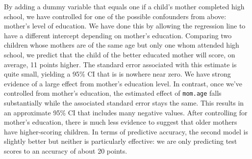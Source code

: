 \documentclass[addpoints,12pt]{exam}\usepackage[]{graphicx}\usepackage[]{xcolor}
\begin{document}
\begin{questions}
\begin{parts}
\begin{solution}
By adding a dummy variable that equals one if a child's mother completed high school, we have controlled for one of the possible confounders from above: mother's level of education. We have done this by allowing the regression line to have a different intercept depending on mother's education. Comparing two children whose mothers are of the same age but only one whom attended high school, we predict that the child of the better educated mother will score, on average, 11 points higher. The standard error associated with this estimate is quite small, yielding a 95\% CI that is is nowhere near zero. We have strong evidence of a large effect from mother's education level. In contrast, once we've controlled from mother's education, the estimated effect of \texttt{mom.age} falls substantially while the associated standard error stays the same. This results in an approximate 95\% CI that includes many negative values. After controlling for mother's education, there is much less evidence to suggest that older mothers have higher-scoring children. In terms of predictive accuracy, the second model is slightly better but neither is particularly effective: we are only predicting test scores to an accuracy of about 20 points.
    \end{solution}

\end{parts}
\end{questions}
\end{document}
